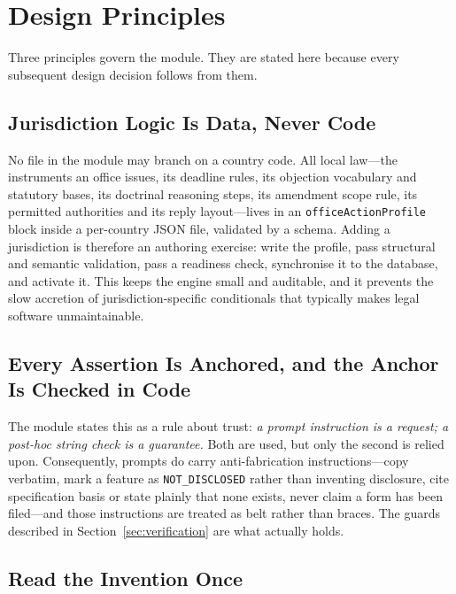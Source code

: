 \documentclass[conference]{IEEEtran}
\newcommand{\code}[1]{\texttt{\small #1}}
\begin{document}
\section{Design Principles}

Three principles govern the module. They are stated here because every subsequent design decision follows from them.

\subsection{Jurisdiction Logic Is Data, Never Code}

No file in the module may branch on a country code. All local law---the instruments an office issues, its deadline rules, its objection vocabulary and statutory bases, its doctrinal reasoning steps, its amendment scope rule, its permitted authorities and its reply layout---lives in an \code{officeActionProfile} block inside a per-country JSON file, validated by a schema. Adding a jurisdiction is therefore an authoring exercise: write the profile, pass structural and semantic validation, pass a readiness check, synchronise it to the database, and activate it. This keeps the engine small and auditable, and it prevents the slow accretion of jurisdiction-specific conditionals that typically makes legal software unmaintainable.

\subsection{Every Assertion Is Anchored, and the Anchor Is Checked in Code}

The module states this as a rule about trust: \emph{a prompt instruction is a request; a post-hoc string check is a guarantee.} Both are used, but only the second is relied upon. Consequently, prompts do carry anti-fabrication instructions---copy verbatim, mark a feature as \code{NOT\_DISCLOSED} rather than inventing disclosure, cite specification basis or state plainly that none exists, never claim a form has been filed---and those instructions are treated as belt rather than braces. The guards described in Section~\ref{sec:verification} are what actually holds.

\subsection{Read the Invention Once}
\end{document}

